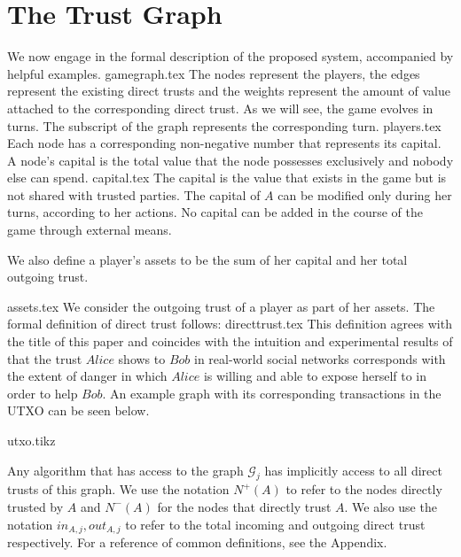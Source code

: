 \section{The Trust Graph}
   We now engage in the formal description of the proposed system, accompanied by helpful examples.
   {gamegraph.tex}
   The nodes represent the players, the edges represent the existing direct trusts and the weights represent the amount of
   value attached to the corresponding direct trust. As we will see, the game evolves in turns. The subscript of the graph
   represents the corresponding turn.
   {players.tex}
   Each node has a corresponding non-negative number that represents its capital. A node's capital is the total value that
   the node possesses exclusively and nobody else can spend.
   {capital.tex}
   The capital is the value that exists in the game but is not shared with trusted parties. The capital of $A$ can be
   modified only during her turns, according to her actions. No capital can be added in the course of the game through
   external means.

   We also define a player's assets to be the sum of her capital and her total outgoing trust.

   {assets.tex}
    We consider the outgoing trust of a player as part of her assets. The formal definition of direct trust follows:
   {directtrust.tex}
   This definition agrees with the title of this paper and coincides with the intuition and experimental results of
   \cite{kmrs} that the trust $Alice$ shows to $Bob$ in real-world social networks corresponds with the extent
   of danger in which $Alice$ is willing and able to expose herself to in order to help $Bob$. An example graph with its
   corresponding transactions in the UTXO can be seen below.

   {utxo.tikz}

   Any algorithm that has access to the graph $\mathcal{G}_j$ has implicitly access to all direct trusts of this graph.
   We use the notation $N^{+}(A)$ to refer to the nodes directly trusted by $A$ and $N^{-}(A)$ for the nodes that directly
   trust $A$. We also use the notation $in_{A, j}, out_{A, j}$ to refer to the total incoming and outgoing direct trust
   respectively. For a reference of common definitions, see the Appendix.
